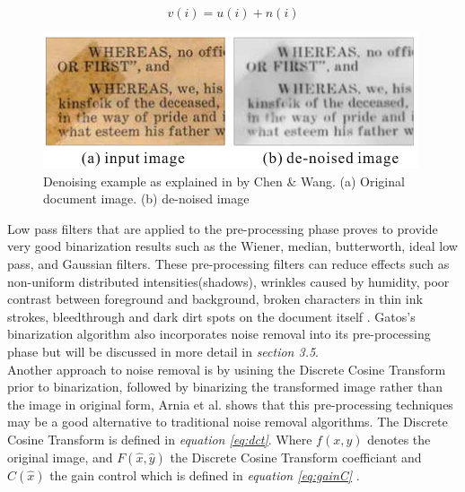 \documentclass[11pt]{article}
\begin{document}
		\begin{large}
		\begin{equation} \label{eq:noise}
		v(i) = u(i) + n(i)
		\end{equation}
		\end{large}

		\begin{figure}[!htb]
		 \centering
		 \includegraphics[scale=1]{denoise.png}
		 \caption{Denoising example as explained in \cite{chen2017broken} by Chen \& Wang. (a) Original document image. (b) de-noised image} %
		 \label{fig:denoise} %
		\end{figure}

		\newpage

			Low pass filters that are applied to the pre-processing phase proves to provide very good binarization results such as the Wiener, median, butterworth, ideal low pass, and Gaussian filters. These pre-processing filters can reduce effects such as non-uniform distributed intensities(shadows), wrinkles caused by humidity, poor contrast between foreground and background, broken characters in thin ink strokes, bleedthrough and dark dirt spots on the document itself \cite{ntogas2008binarization}. Gatos's binarization algorithm also incorporates noise removal into its pre-processing phase but will be discussed in more detail in \textit{section 3.5}. \\

			Another approach to noise removal is by usining the Discrete Cosine Transform prior to binarization, followed by binarizing the transformed image rather than the image in original form, Arnia et al. \cite{arnia2014improvement} shows that this pre-processing techniques may be a good alternative to traditional noise removal algorithms. The Discrete Cosine Transform is defined in \textit{equation \ref{eq:dct}}. Where $f(x, y)$ denotes the original image, and $F(\hat{x}, \hat{y})$ the Discrete Cosine Transform coefficiant and $C(\hat{x})$ the gain control which is defined in \textit{equation \ref{eq:gainC}} \cite{arnia2014improvement}.
\end{document}
